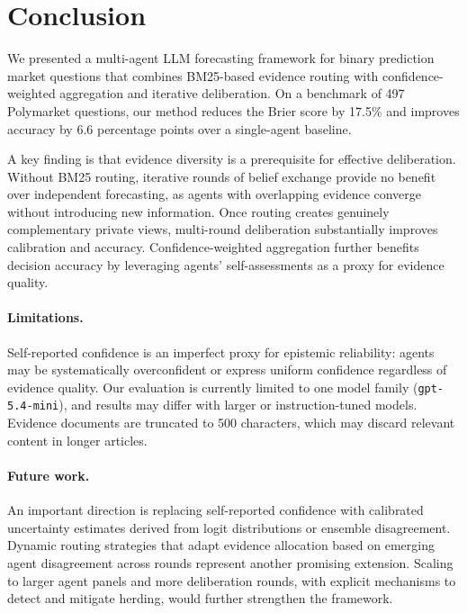 \documentclass[11pt]{article}
\theoremstyle{definition}          %
\begin{document}
\section{Conclusion}
\label{sec:conclusion}

We presented a multi-agent LLM forecasting framework for binary prediction market
questions that combines BM25-based evidence routing with confidence-weighted aggregation
and iterative deliberation.
On a benchmark of 497 Polymarket questions, our method reduces the Brier score by
17.5\% and improves accuracy by 6.6 percentage points over a single-agent baseline.

A key finding is that evidence diversity is a prerequisite for effective deliberation.
Without BM25 routing, iterative rounds of belief exchange provide no benefit over
independent forecasting, as agents with overlapping evidence converge without
introducing new information.
Once routing creates genuinely complementary private views, multi-round deliberation
substantially improves calibration and accuracy.
Confidence-weighted aggregation further benefits decision accuracy by leveraging
agents' self-assessments as a proxy for evidence quality.

\paragraph{Limitations.}
Self-reported confidence is an imperfect proxy for epistemic reliability: agents may
be systematically overconfident or express uniform confidence regardless of evidence
quality.
Our evaluation is currently limited to one model family (\texttt{gpt-5.4-mini}),
and results may differ with larger or instruction-tuned models.
Evidence documents are truncated to 500 characters, which may discard relevant content
in longer articles.

\paragraph{Future work.}
An important direction is replacing self-reported confidence with calibrated uncertainty
estimates derived from logit distributions or ensemble disagreement.
Dynamic routing strategies that adapt evidence allocation based on emerging agent
disagreement across rounds represent another promising extension.
Scaling to larger agent panels and more deliberation rounds, with explicit mechanisms
to detect and mitigate herding, would further strengthen the framework.


\end{document}
